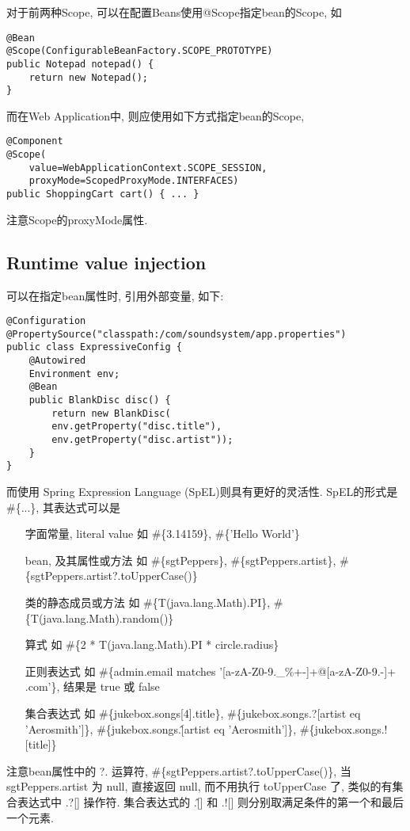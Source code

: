 \documentclass[UTF8, heading=true, scheme=chinese]{ctexart}
\begin{document}
对于前两种Scope, 可以在配置Beans使用@Scope指定bean的Scope, 如
\begin{verbatim}
@Bean
@Scope(ConfigurableBeanFactory.SCOPE_PROTOTYPE)
public Notepad notepad() {
	return new Notepad();
}
\end{verbatim}

而在Web Application中, 则应使用如下方式指定bean的Scope,
\begin{verbatim}
@Component
@Scope(
	value=WebApplicationContext.SCOPE_SESSION,
	proxyMode=ScopedProxyMode.INTERFACES)
public ShoppingCart cart() { ... }
\end{verbatim}

注意Scope的proxyMode属性. 




\subsection[Scope beans]{Runtime value injection} \label{sec:runtime}
可以在指定bean属性时, 引用外部变量,  如下:
\begin{verbatim}
@Configuration
@PropertySource("classpath:/com/soundsystem/app.properties")
public class ExpressiveConfig {
	@Autowired
	Environment env;
	@Bean
	public BlankDisc disc() {
		return new BlankDisc(
		env.getProperty("disc.title"),
		env.getProperty("disc.artist"));
	}
}
\end{verbatim}

而使用 Spring Expression Language (SpEL)则具有更好的灵活性.
SpEL的形式是 \#\{...\}, 其表达式可以是
\begin{enumerate}
	\item[字面常量, literal value]	如 \#\{3.14159\}, \#\{'Hello World'\}
	\item[bean, 及其属性或方法]	如 \#\{sgtPeppers\}, \#\{sgtPeppers.artist\}, \#\{sgtPeppers.artist?.toUpperCase()\}
	\item[类的静态成员或方法]	如 \#\{T(java.lang.Math).PI\}, \#\{T(java.lang.Math).random()\}
	\item[算式] 	如 \#\{2 * T(java.lang.Math).PI * circle.radius\}
	\item[正则表达式]	如 \#\{admin.email matches '[a-zA-Z0-9._\%+-]+@[a-zA-Z0-9.-]+\\.com'\}, 结果是 true 或 false
	\item[集合表达式]	如 \#\{jukebox.songs[4].title\}, \#\{jukebox.songs.?[artist eq 'Aerosmith']\},  \#\{jukebox.songs.\^[artist eq 'Aerosmith']\}, \#\{jukebox.songs.![title]\}
\end{enumerate}

注意bean属性中的 ?. 运算符, \#\{sgtPeppers.artist?.toUpperCase()\}, 当 sgtPeppers.artist 为 null, 直接返回 null, 而不用执行 toUpperCase 了, 类似的有集合表达式中 .?[] 操作符.
集合表达式的 .\^[] 和 .![] 则分别取满足条件的第一个和最后一个元素. 
\end{document}
